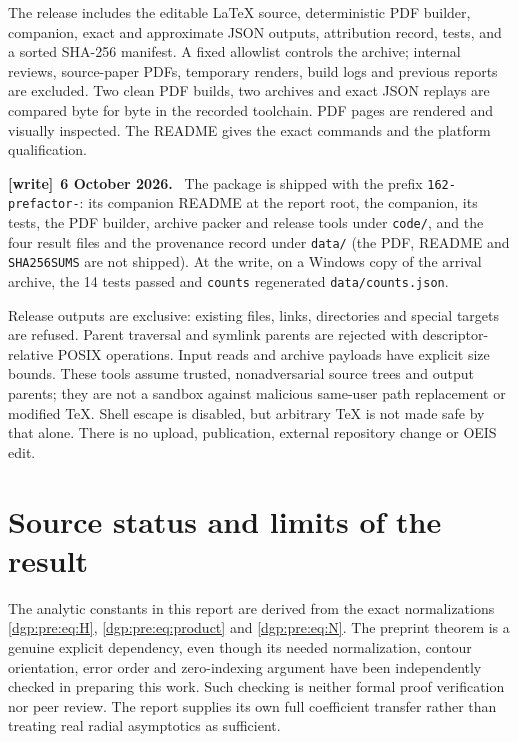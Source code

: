 \documentclass[11pt,letterpaper]{article}
\numberwithin{equation}{section}
\theoremstyle{remark}\newtheorem{remark}[theorem]{Remark}
\newcommand{\file}[1]{\nolinkurl{#1}}
\newenvironment{writenote}[1][]{\par\smallskip\begingroup\small
 \noindent\textbf{[write]}\if\relax\detokenize{#1}\relax\else~\textbf{#1.}\fi\ }%
 {\par\endgroup\smallskip}
\begin{document}
The release includes the editable LaTeX source, deterministic PDF
builder, companion, exact and approximate JSON outputs, attribution
record, tests, and a sorted SHA-256 manifest. A fixed allowlist controls
the archive; internal reviews, source-paper PDFs, temporary renders,
build logs and previous reports are excluded. Two clean PDF builds,
two archives and exact JSON replays are compared byte for byte in the
recorded toolchain. PDF pages are rendered and visually inspected.
The README gives the exact commands and the platform qualification.
\begin{writenote}[6 October 2026]
The package is shipped with the prefix \file{162-prefactor-}: its companion README at the report root, the companion, its tests, the PDF builder, archive packer and release tools under \file{code/}, and the four result files and the provenance record under \file{data/} (the PDF, README and \file{SHA256SUMS} are not shipped). At the write, on a Windows copy of the arrival archive, the 14 tests passed and \texttt{counts} regenerated \file{data/counts.json}.
\end{writenote}

Release outputs are exclusive: existing files, links, directories and
special targets are refused. Parent traversal and symlink parents are
rejected with descriptor-relative POSIX operations. Input reads and
archive payloads have explicit size bounds. These tools assume trusted,
nonadversarial source trees and output parents; they are not a sandbox
against malicious same-user path replacement or modified TeX. Shell
escape is disabled, but arbitrary TeX is not made safe by that alone.
There is no upload, publication, external repository change or OEIS edit.

\section{Source status and limits of the result}\label{dgp:pre:sec:limits}
The analytic constants in this report are derived from the exact
normalizations \eqref{dgp:pre:eq:H}, \eqref{dgp:pre:eq:product} and \eqref{dgp:pre:eq:N}.
The preprint theorem is a genuine explicit dependency, even though
its needed normalization, contour orientation, error order and
zero-indexing argument have been independently checked in preparing
this work. Such checking is neither formal proof verification nor
peer review. The report supplies its own full coefficient transfer
rather than treating real radial asymptotics as sufficient.
\end{document}
